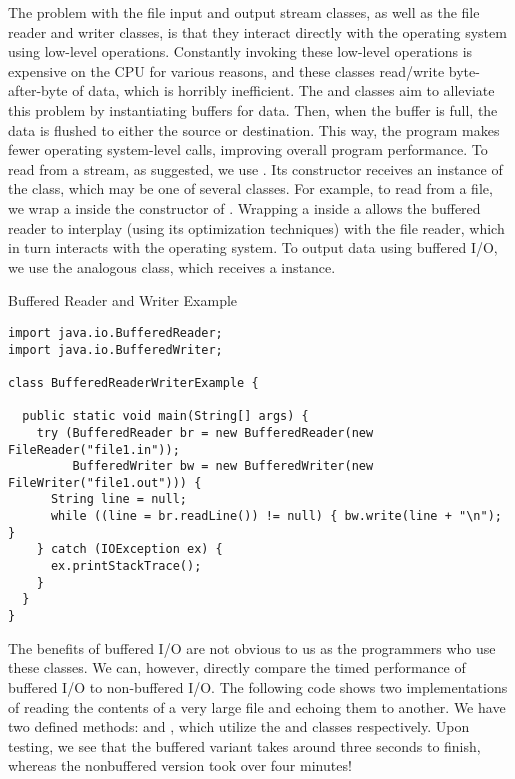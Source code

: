 The problem with the file input and output stream classes, as well as the file reader and writer classes, is that they interact directly with the operating system using low-level operations. Constantly invoking these low-level operations is expensive on the CPU for various reasons, and these classes read/write byte-after-byte of data, which is horribly inefficient. The  and  classes aim to alleviate this problem by instantiating buffers for data. Then, when the buffer is full, the data is flushed to either the source or destination. This way, the program makes fewer operating system-level calls, improving overall program performance. To read from a stream, as suggested, we use . Its constructor receives an instance of the  class, which may be one of several classes. For example, to read from a file, we wrap a  inside the constructor of . Wrapping a  inside a  allows the buffered reader to interplay (using its optimization techniques) with the file reader, which in turn interacts with the operating system. To output data using buffered I/O, we use the analogous  class, which receives a  instance. 


\begin{cl}[]{Buffered Reader and Writer Example}
\begin{lstlisting}[language=MyJava]
import java.io.BufferedReader;
import java.io.BufferedWriter;

class BufferedReaderWriterExample {

  public static void main(String[] args) {
    try (BufferedReader br = new BufferedReader(new FileReader("file1.in"));
         BufferedWriter bw = new BufferedWriter(new FileWriter("file1.out"))) {
      String line = null;
      while ((line = br.readLine()) != null) { bw.write(line + "\n"); }
    } catch (IOException ex) {
      ex.printStackTrace();
    }
  }
}
\end{lstlisting}
\end{cl}

The benefits of buffered I/O are not obvious to us as the programmers who use these classes. We can, however, directly compare the timed performance of buffered I/O to non-buffered I/O. The following code shows two implementations of reading the contents of a very large file and echoing them to another. We have two defined methods:  and , which utilize the  and  classes respectively. Upon testing, we see that the buffered variant takes around three seconds to finish, whereas the nonbuffered version took over four minutes!

